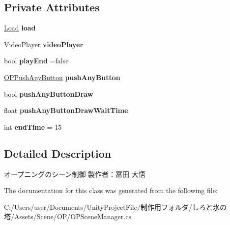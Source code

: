 \subsection*{Private Attributes}
\begin{DoxyCompactItemize}
\item 
\mbox{\label{class_o_p_scene_manager_a63ca245eca4a21f4e7568d7e2cd63501}} 
\hyperlink{class_load}{Load} {\bfseries load}
\item 
\mbox{\label{class_o_p_scene_manager_a5ac727d87bdddc904e61c45374433633}} 
Video\+Player {\bfseries video\+Player}
\item 
\mbox{\label{class_o_p_scene_manager_aa8cb39464eb1cf5a4b2220329a2ddff1}} 
bool {\bfseries play\+End} =false
\item 
\mbox{\label{class_o_p_scene_manager_a29aa62b8fb356fc3e097865615ec9725}} 
\hyperlink{class_o_p_push_any_button}{O\+P\+Push\+Any\+Button} {\bfseries push\+Any\+Button}
\item 
\mbox{\label{class_o_p_scene_manager_ac0cda8b88239e540a63cbf2b564e4762}} 
bool {\bfseries push\+Any\+Button\+Draw}
\item 
\mbox{\label{class_o_p_scene_manager_a42a5d45b3f8c3ac29c04411a672e24b8}} 
float {\bfseries push\+Any\+Button\+Draw\+Wait\+Time}
\item 
\mbox{\label{class_o_p_scene_manager_a4e78999c3db47f30b1a8c12caf5c5a95}} 
int {\bfseries end\+Time} = 15
\end{DoxyCompactItemize}


\subsection{Detailed Description}
オープニングのシーン制御 製作者：冨田 大悟 



The documentation for this class was generated from the following file\+:\begin{DoxyCompactItemize}
\item 
C\+:/\+Users/user/\+Documents/\+Unity\+Project\+File/制作用フォルダ/しろと氷の塔/\+Assets/\+Scene/\+O\+P/O\+P\+Scene\+Manager.\+cs\end{DoxyCompactItemize}
